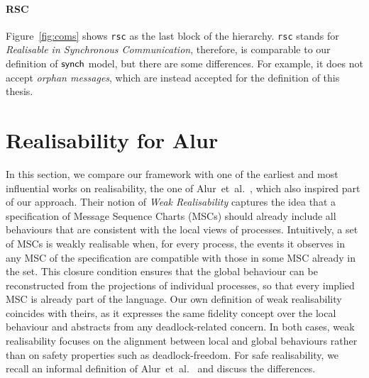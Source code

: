 
\paragraph{RSC}
Figure~\ref{fig:coms} shows \verb|rsc| as the last block of the hierarchy.
\verb|rsc| stands for \emph{Realisable in Synchronous Communication}, therefore, 
is comparable to our definition of $\mathsf{synch}$ model, but there are 
some differences. For example, it does not accept \emph{orphan messages}, 
which are instead accepted for the definition of this thesis.


\section{Realisability for Alur}
In this section, we compare our framework with one of the earliest and
most influential works on realisability, the one of 
Alur~et~al.~\cite{alur2005realizability}, which also inspired part of our
approach. Their notion of \emph{Weak Realisability} captures the idea that
a specification of Message Sequence Charts (MSCs) should already include
all behaviours that are consistent with the local views of processes. 
Intuitively, a set of MSCs is weakly realisable when, for every process,
the events it observes in any MSC of the specification are compatible
with those in some MSC already in the set. This closure condition ensures
that the global behaviour can be reconstructed from the projections of
individual processes, so that every implied MSC is already part of the
language. 
Our own definition
of weak realisability coincides with theirs, as it expresses the same
fidelity concept over the local behaviour and abstracts from any
deadlock-related concern. In both cases, weak realisability focuses on
the alignment between local and global behaviours rather than on safety
properties such as deadlock-freedom. For safe realisability, we recall an
informal definition of Alur~et~al.~\cite{alur2005realizability} and discuss
the differences.

